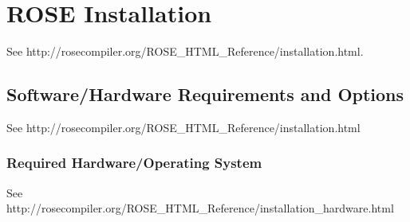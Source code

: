 \section{ROSE Installation}

See http://rosecompiler.org/ROSE\_HTML\_Reference/installation.html.

\subsection{Software/Hardware Requirements and Options}
\label{Requirements_Installation_Testing}

See http://rosecompiler.org/ROSE\_HTML\_Reference/installation.html


\subsubsection{Required Hardware/Operating System}

See http://rosecompiler.org/ROSE\_HTML\_Reference/installation\_hardware.html




